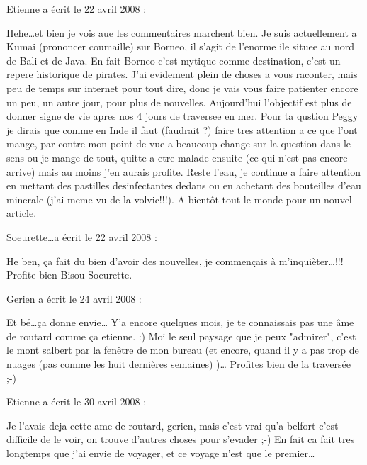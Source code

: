 \medskip
Etienne a écrit le 22 avril 2008 :
\begin{displayquote}
Hehe\dots et bien je vois aue les commentaires marchent bien.
Je suis actuellement a Kumai (prononcer coumaille) sur Borneo, il s'agit de l'enorme ile situee au nord de Bali et de Java.
En fait Borneo c'est mytique comme destination, c'est un repere historique de pirates.
J'ai evidement plein de choses a vous raconter, mais peu de temps sur internet pour tout dire, donc je vais vous faire patienter encore un peu, un autre jour, pour plus de nouvelles. Aujourd'hui l'objectif est plus de donner signe de vie apres nos 4 jours de traversee en mer.
Pour ta qustion Peggy je dirais que comme en Inde il faut (faudrait ?) faire tres attention a ce que l'ont mange, par contre mon point de vue a beaucoup change sur la question dans le sens ou je mange de tout, quitte a etre malade ensuite (ce qui n'est pas encore arrive) mais au moins j'en aurais profite. Reste l'eau, je continue a faire attention en mettant des pastilles desinfectantes dedans ou en achetant des bouteilles d'eau minerale (j'ai meme vu de la volvic!!!).
A bientôt tout le monde pour un nouvel article.
\end{displayquote}

\medskip
Soeurette\dots a écrit le 22 avril 2008 :
\begin{displayquote}
He ben, ça fait du bien  d'avoir des nouvelles, je commençais à m'inquièter\dots!!!
Profite bien
Bisou
Soeurette.
\end{displayquote}

\medskip
Gerien a écrit le 24 avril 2008 :
\begin{displayquote}
Et bé\dots ça donne envie\dots
Y'a encore quelques mois, je te connaissais pas une âme de routard comme ça etienne. :)
Moi le seul paysage que je peux "admirer", c'est le mont salbert par la fenêtre de mon bureau (et encore, quand il y a pas trop de nuages (pas comme les huit dernières semaines) )\dots
Profites bien de la traversée ;-)
\end{displayquote}

\medskip
Etienne a écrit le 30 avril 2008 :
\begin{displayquote}
Je l'avais deja cette ame de routard, gerien, mais c'est vrai qu'a belfort c'est difficile de le voir, on trouve d'autres choses pour s'evader ;-) En fait ca fait tres longtemps que j'ai envie de voyager, et ce voyage n'est que le premier\dots
\end{displayquote}

\vfill
